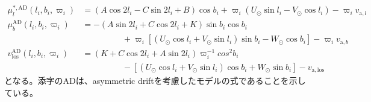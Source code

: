 \begin{subequations}
\begin{align}
	\mu^{*,\mathrm{AD}}_l(l_i,b_i,\varpi_i) &= (A\cos2l_i - C\sin2l_i + B)\cos b_i + \varpi_i(U_{\odot}\sin l_i - V_{\odot}\cos l_i) - \varpi_i v_{\mathrm{a},l} \\
	\mu^{\mathrm{AD}}_b(l_i,b_i,\varpi_i) &= -(A\sin2l_i + C\cos2l_i + K)\sin b_i \cos b_i \nonumber \\
	                          & \hspace{2cm} + \varpi_i[(U_{\odot}\cos l_i + V_{\odot} \sin l_i)\sin b_i - W_{\odot} \cos b_i] - \varpi_i v_{\mathrm{a},b} \\
	v^{\mathrm{AD}}_{\mathrm{los}}(l_i,b_i,\varpi_i) &= (K + C\cos2l_i + A\sin2l_i)\varpi_i^{-1} cos^2 b_i \nonumber \\
	                      & \hspace{2cm} - [(U_{\odot}\cos l_i + V_{\odot} \sin l_i)\cos b_i + W_{\odot} \sin b_i] - v_{\mathrm{a,los}}
\end{align} \label{ObsEqAD}
\end{subequations}
となる。添字のADは、asymmetric driftを考慮したモデルの式であることを示している。







